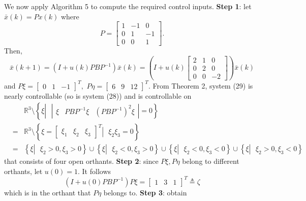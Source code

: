 \documentclass[journal,a4paper,12pt,onecolumn]{IEEEtran}
\begin{document}
We now apply Algorithm 5 to compute the required control inputs. \textbf{Step 1}: let $\bar{x}\left( k\right) =Px\left( k\right) $ where\begin{equation*}
P=\left[
\begin{array}{ccc}
1 & -1 & 0 \\
0 & 1 & -1 \\
0 & 0 & 1\end{array}\right] .
\end{equation*}Then,\begin{equation}
\bar{x}\left( k+1\right) =\left( I+u\left( k\right) PBP^{-1}\right) \bar{x}\left( k\right) =\left( I+u\left( k\right) \left[
\begin{array}{ccc}
2 & 1 & 0 \\
0 & 2 & 0 \\
0 & 0 & -2\end{array}\right] \right) \bar{x}\left( k\right)
\end{equation}and $P\xi =\left[
\begin{array}{ccc}
0 & 1 & -1\end{array}\right] ^{T},$ $P\eta =\left[
\begin{array}{ccc}
6 & 9 & 12\end{array}\right] ^{T}$. From Theorem 2, system (29) is nearly controllable (so is
system (28)) and is controllable on\begin{eqnarray*}
&&\mathbb{R}
^{3}\setminus \left\{ \xi \left\vert \text{ }\left\vert
\begin{array}{ccc}
\xi & PBP^{-1}\xi & \left( PBP^{-1}\right) ^{2}\xi \end{array}\right\vert =0\right. \right\} \\
&=&\mathbb{R}
^{3}\setminus \left\{ \xi =\left[
\begin{array}{ccc}
\xi _{1} & \xi _{2} & \xi _{3}\end{array}\right] ^{T}\left\vert \text{ }\xi _{2}\xi _{3}=0\right. \right\} \\
&=&\left\{ \xi \left\vert \text{ }\xi _{2}>0,\xi _{3}>0\right. \right\} \cup
\left\{ \xi \left\vert \text{ }\xi _{2}<0,\xi _{3}>0\right. \right\} \cup
\left\{ \xi \left\vert \text{ }\xi _{2}<0,\xi _{3}<0\right. \right\} \cup
\left\{ \xi \left\vert \text{ }\xi _{2}>0,\xi _{3}<0\right. \right\}
\end{eqnarray*}that consists of four open orthants. \textbf{Step 2}: since $P\xi ,P\eta $
belong to different orthants, let $u\left( 0\right) =1$. It follows\begin{equation*}
\left( I+u\left( 0\right) PBP^{-1}\right) P\xi =\left[
\begin{array}{ccc}
1 & 3 & 1\end{array}\right] ^{T}\triangleq \zeta
\end{equation*}which is in the orthant that $P\eta $ belongs to. \textbf{Step 3}: obtain
\end{document}
